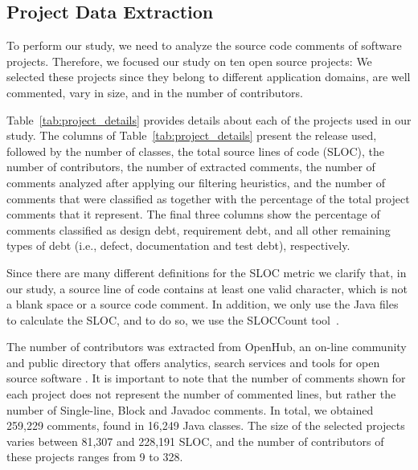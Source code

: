 \subsection{Project Data Extraction}
\label{sub:data_extraction}

To perform our study, we need to analyze the source code comments of software projects. Therefore, we focused our study on ten open source projects: We selected these projects since they belong to different application domains, are well commented, vary in size, and in the number of contributors. 
    
Table~\ref{tab:project_details} provides details about each of the projects used in our study. The columns of Table~\ref{tab:project_details} present the release used, followed by the number of classes, the total source lines of code (SLOC), the number of contributors, the number of extracted comments, the number of comments analyzed after applying our filtering heuristics, and the number of comments that were classified as \SATD together with the percentage of the total project comments that it represent.
The final three columns show the percentage of \SATD comments classified as design debt, requirement debt, and all other remaining types of debt (i.e., defect, documentation and test debt), respectively. 

Since there are many different definitions for the SLOC metric we clarify that, in our study, a source line of code contains at least one valid character, which is not a blank space or a source code comment. In addition, we only use the Java files to calculate the SLOC, and to do so, we use the SLOCCount tool~\cite{wheeler2004:home}. 

The number of contributors was extracted from OpenHub, an on-line community and public directory that offers analytics, search services and tools for open source software \cite{Openhub:home}. It is important to note that the number of comments shown for each project does not represent the number of commented lines, but rather the number of Single-line, Block and Javadoc comments. In total, we obtained 259,229 comments, found in 16,249 Java classes. The size of the selected projects varies between 81,307 and 228,191 SLOC, and the number of contributors of these projects ranges from 9 to 328. 


